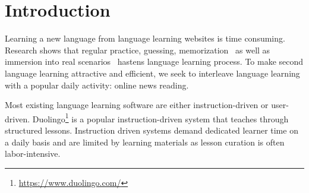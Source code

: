 \section{Introduction}
Learning a new language from language learning websites is 
time consuming. Research shows that regular practice, guessing, 
memorization~\cite{Rubin1975} as well as immersion into real 
scenarios~\cite{Naiman1978} hastens language learning process. 
To make second language learning 
attractive and efficient, we seek to interleave language learning 
with a popular daily activity: online news reading.



Most existing language learning software are either instruction-driven
or user-driven.  Duolingo\footnote{\url{https://www.duolingo.com/}} is
a popular instruction-driven system that teaches through structured
lessons.
Instruction driven systems demand dedicated learner time on a daily
basis and are limited by learning materials as lesson curation is
often labor-intensive.

